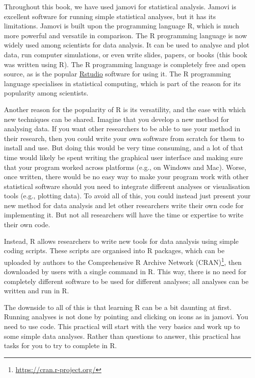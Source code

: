 \documentclass[
]{scrbook}
\begin{document}
Throughout this book, we have used jamovi for statistical analysis.
Jamovi is excellent software for running simple statistical analyses, but it has its limitations.
Jamovi is built upon the programming language R, which is much more powerful and versatile in comparison.
The R programming language is now widely used among scientists for data analysis.
It can be used to analyse and plot data, run computer simulations, or even write slides, papers, or books (this book was written using R).
The R programming language is completely free and open source, as is the popular \href{https://posit.co/downloads/}{Rstudio} software for using it.
The R programming language specialises in statistical computing, which is part of the reason for its popularity among scientists.

Another reason for the popularity of R is its versatility, and the ease with which new techniques can be shared.
Imagine that you develop a new method for analysing data.
If you want other researchers to be able to use your method in their research, then you could write your own software from scratch for them to install and use.
But doing this would be very time consuming, and a lot of that time would likely be spent writing the graphical user interface and making sure that your program worked across platforms (e.g., on Windows and Mac).
Worse, once written, there would be no easy way to make your program work with other statistical software should you need to integrate different analyses or visualisation tools (e.g., plotting data).
To avoid all of this, you could instead just present your new method for data analysis and let other researchers write their own code for implementing it.
But not all researchers will have the time or expertise to write their own code.

Instead, R allows researchers to write new tools for data analysis using simple coding scripts.
These scripts are organised into R packages, which can be uploaded by authors to the Comprehensive R Archive Network (CRAN)\footnote{\url{https://cran.r-project.org/}}, then downloaded by users with a single command in R.
This way, there is no need for completely different software to be used for different analyses; all analyses can be written and run in R.

The downside to all of this is that learning R can be a bit daunting at first.
Running analyses is not done by pointing and clicking on icons as in jamovi.
You need to use code.
This practical will start with the very basics and work up to some simple data analyses.
Rather than questions to answer, this practical has tasks for you to try to complete in R.
\end{document}

